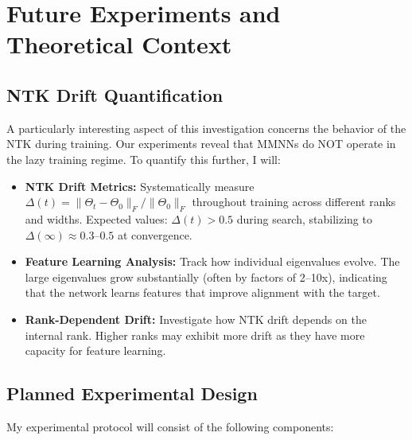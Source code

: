 \documentclass[12pt]{article}
\begin{document}
\newpage
\section{Future Experiments and Theoretical Context}

\subsection{NTK Drift Quantification}

A particularly interesting aspect of this investigation concerns the behavior of the NTK during training. Our experiments reveal that MMNNs do NOT operate in the lazy training regime. To quantify this further, I will:

\begin{itemize}
    \item \textbf{NTK Drift Metrics:} Systematically measure $\Delta(t) = \|\Theta_t - \Theta_0\|_F/\|\Theta_0\|_F$ throughout training across different ranks and widths. Expected values: $\Delta(t) > 0.5$ during search, stabilizing to $\Delta(\infty) \approx 0.3$--$0.5$ at convergence.
    
    \item \textbf{Feature Learning Analysis:} Track how individual eigenvalues evolve. The large eigenvalues grow substantially (often by factors of 2--10x), indicating that the network learns features that improve alignment with the target.
    
    \item \textbf{Rank-Dependent Drift:} Investigate how NTK drift depends on the internal rank. Higher ranks may exhibit more drift as they have more capacity for feature learning.
\end{itemize}

\subsection{Planned Experimental Design}

My experimental protocol will consist of the following components:
\end{document}
